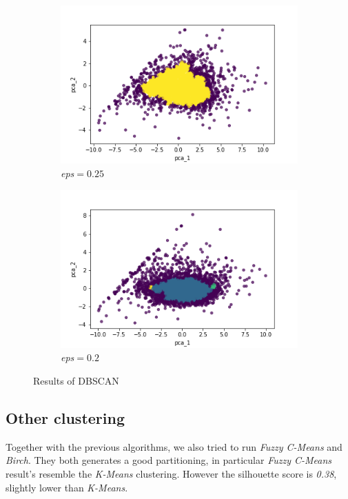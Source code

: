 \begin{figure}[h!]
	\vspace{-4mm}
	\captionsetup{justification=centering}
	\centering
	\begin{subfigure}{0.49\textwidth}
		\includegraphics[width=.65\textwidth]{img/clustering/dbscan.png}
		\centering
		\caption{\emph{eps}$ = 0.25$}
		\label{fig:dbscan_good}
	\end{subfigure}
	\begin{subfigure}{0.49\textwidth}
		\includegraphics[width=.65\textwidth]{img/clustering/dbscan_bad.png}
		\centering
		\caption{\emph{eps}$ = 0.2$}
		\label{fig:dbscan_bad}
	\end{subfigure}
	\caption{Results of DBSCAN}
	\label{fig:dbscan}
\end{figure}

\subsection{Other clustering}

Together with the previous algorithms, we also tried to run \emph{Fuzzy C-Means} and \emph{Birch}. They both generates a good partitioning, in particular \emph{Fuzzy C-Means} result's resemble the \emph{K-Means} clustering. However the silhouette score is \emph{0.38}, slightly lower than \emph{K-Means}.

